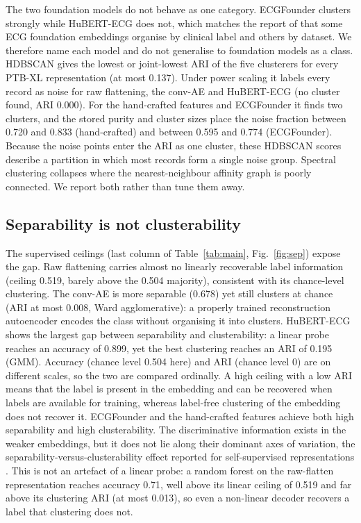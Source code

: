 \documentclass[preprint,11pt]{elsarticle}
\begin{document}
The two foundation models do not behave as one category. ECGFounder clusters strongly while
HuBERT-ECG does not, which matches the report of \cite{lookingbeyond2026} that some ECG
foundation embeddings organise by clinical label and others by dataset. We therefore name
each model and do not generalise to foundation models as a class. HDBSCAN gives the
lowest or joint-lowest ARI of the five clusterers for every PTB-XL representation (at most
0.137). Under power scaling it labels every record as noise for raw flattening, the
conv-AE and HuBERT-ECG (no cluster found, ARI 0.000). For the hand-crafted features and
ECGFounder it finds two clusters, and the stored purity and cluster sizes place the noise
fraction between 0.720 and 0.833 (hand-crafted) and between 0.595 and 0.774 (ECGFounder).
Because the noise points enter the ARI as one cluster, these HDBSCAN scores describe a
partition in which most records form a single noise group. Spectral clustering collapses
where the nearest-neighbour affinity graph is poorly connected. We report both rather than
tune them away.

\subsection{Separability is not clusterability}\label{sec:sep}

The supervised ceilings (last column of Table~\ref{tab:main}, Fig.~\ref{fig:sep})
expose the gap. Raw flattening carries almost no linearly recoverable label information
(ceiling 0.519, barely above the 0.504 majority), consistent with its chance-level
clustering. The conv-AE is more separable (0.678) yet still clusters at chance (ARI at
most 0.008, Ward agglomerative): a properly trained reconstruction autoencoder encodes
the class without organising it into clusters. HuBERT-ECG shows the largest gap between
separability and clusterability: a linear probe reaches an accuracy of 0.899, yet the best
clustering reaches an ARI of 0.195 (GMM). Accuracy (chance level 0.504 here) and ARI
(chance level 0) are on different scales, so the two are compared ordinally. A high
ceiling with a low ARI means that the label is present in the embedding and can be
recovered when labels are available for training, whereas label-free clustering of the
embedding does not recover it. ECGFounder and the hand-crafted features achieve both high
separability and high clusterability. The discriminative information exists in the weaker
embeddings, but it does not lie along their dominant axes of variation, the
separability-versus-clusterability effect reported for self-supervised representations \cite{sslclustering2025}. This is not an
artefact of a linear probe: a random forest on the raw-flatten representation reaches
accuracy 0.71, well above its linear ceiling of 0.519 and far above its clustering ARI (at
most 0.013), so even a non-linear decoder recovers a label that clustering does not.
\end{document}
